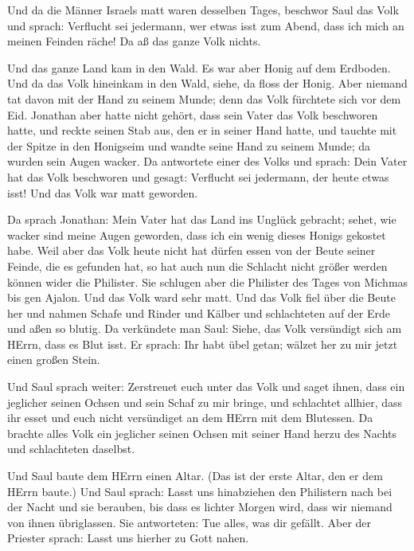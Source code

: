  Und da die Männer Israels matt waren desselben Tages,
beschwor Saul das Volk und sprach: Verflucht sei jedermann, wer etwas
isst zum Abend, dass ich mich an meinen Feinden räche! Da aß das ganze
Volk nichts.

 Und das ganze Land kam in den Wald. Es war aber Honig auf
dem Erdboden.  Und da das Volk hineinkam in den Wald,
siehe, da floss der Honig. Aber niemand tat davon mit der Hand zu seinem
Munde; denn das Volk fürchtete sich vor dem Eid.  Jonathan
aber hatte nicht gehört, dass sein Vater das Volk beschworen hatte, und
reckte seinen Stab aus, den er in seiner Hand hatte, und tauchte mit der
Spitze in den Honigseim und wandte seine Hand zu seinem Munde; da wurden
sein Augen wacker.  Da antwortete einer des Volks und
sprach: Dein Vater hat das Volk beschworen und gesagt: Verflucht sei
jedermann, der heute etwas isst! Und das Volk war matt geworden.

 Da sprach Jonathan: Mein Vater hat das Land ins Unglück
gebracht; sehet, wie wacker sind meine Augen geworden, dass ich ein
wenig dieses Honigs gekostet habe.  Weil aber das Volk
heute nicht hat dürfen essen von der Beute seiner Feinde, die es
gefunden hat, so hat auch nun die Schlacht nicht größer werden können
wider die Philister.  Sie schlugen aber die Philister des
Tages von Michmas bis gen Ajalon. Und das Volk ward sehr matt.
 Und das Volk fiel über die Beute her und nahmen Schafe und
Rinder und Kälber und schlachteten auf der Erde und aßen so blutig.
 Da verkündete man Saul: Siehe, das Volk versündigt sich am
HErrn, dass es Blut isst. Er sprach: Ihr habt übel getan; wälzet her zu
mir jetzt einen großen Stein.

 Und Saul sprach weiter: Zerstreuet euch unter das Volk und
saget ihnen, dass ein jeglicher seinen Ochsen und sein Schaf zu mir
bringe, und schlachtet allhier, dass ihr esset und euch nicht
versündiget an dem HErrn mit dem Blutessen. Da brachte alles Volk ein
jeglicher seinen Ochsen mit seiner Hand herzu des Nachts und
schlachteten daselbst.

 Und Saul baute dem HErrn einen Altar. (Das ist der erste
Altar, den er dem HErrn baute.)  Und Saul sprach: Lasst uns
hinabziehen den Philistern nach bei der Nacht und sie berauben, bis dass
es lichter Morgen wird, dass wir niemand von ihnen übriglassen. Sie
antworteten: Tue alles, was dir gefällt. Aber der Priester sprach: Lasst
uns hierher zu Gott nahen.

